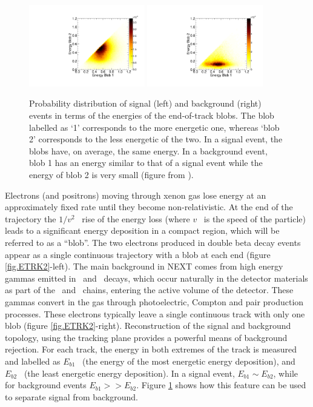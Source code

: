 \documentclass[a4paper,11pt]{article}
\begin{document}
\begin{figure}[!htb]
\centering
\includegraphics[width=0.45\textwidth]{fig/EnergyBlobsSignal.pdf}
\includegraphics[width=0.45\textwidth]{fig/EnergyBlobsTl208.pdf}
\caption{Probability distribution of signal (left) and background (right) events in terms of the energies of the end-of-track blobs. The blob labelled as `1' corresponds to the more energetic one, whereas `blob 2' corresponds to the less energetic of the two. In a signal event, the blobs have, on average, the same energy. In a background event, blob 1 has an energy similar to that of a signal event while the energy of blob 2 is very small (figure from \cite{MartinAlbo_thesis}).} \label{fig.BLOBS}
\end{figure}

Electrons (and positrons) moving through xenon gas lose energy at an approximately fixed rate until they become non-relativistic. At the end of the trajectory the $1/v^2$~ rise of the energy loss (where $v$~ is the speed of the particle) leads to a significant energy deposition in a compact region, which will be referred to as a ``blob''. The two electrons produced in double beta decay events appear as a single continuous trajectory with a blob at each end (figure \ref{fig.ETRK2}-left). The main background in NEXT comes from high energy gammas emitted in \TL\ and \BI\ decays, which occur naturally in the detector materials as part of the \THT\ and \UTT\ chains, entering the active volume of the detector. These gammas convert in the gas through photoelectric, Compton and pair production processes. These electrons typically leave a single continuous track with only one blob (figure \ref{fig.ETRK2}-right). 
Reconstruction of the signal and background topology, using the tracking plane provides a powerful means of background rejection. For each track, the energy in both extremes of the track is measured and labelled as $E_{b1}$~ (the energy of the most energetic energy deposition), and $E_{b2}$~ (the least energetic energy deposition). In a signal event, $E_{b1} \sim E_{b2} $, while for background events $E_{b1} >> E_{b2} $. Figure \ref{fig.BLOBS} shows how this feature can be used to separate signal from background. 
\end{document}
